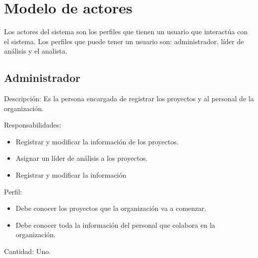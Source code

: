 \section{Modelo de actores}
Los actores del sistema son los perfiles que tienen un usuario que interactúa con el sistema. Los perfiles que puede tener un usuario son: administrador, líder de análisis y el analista.
\begin{Usuario}{\hypertarget{admin}{\subsection{Administrador}}}{
}
	\item[Descripción: ]
	Es la persona encargada de registrar los proyectos y al personal de la organización.
    \item[Responsabilidades:] \cdtEmpty
    \begin{itemize}
		\item Registrar y modificar la información de los proyectos.
		\item Asignar un líder de análisis a los proyectos.
		\item Registrar y modificar la información
    \end{itemize}

	\item[Perfil:] \cdtEmpty
    \begin{itemize}
		\item Debe conocer los proyectos que la organización va a comenzar.
		\item Debe conocer toda la información del personal que colabora en la organización.
    \end{itemize}
    
    \item[Cantidad: ]
    Uno.
\end{Usuario}

